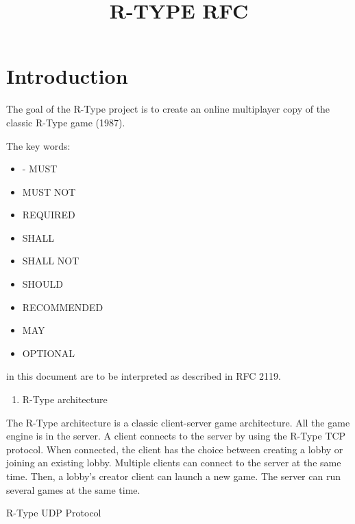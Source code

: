\documentclass[12pt, letterpaper]{article}\title{R-TYPE RFC}
\begin{document}
\section{Introduction}
\vspace{5mm} %

The goal of the R-Type project is to create an online multiplayer copy
of the classic R-Type game (1987).

The key words:  
\begin{itemize}
    \item - MUST
    \item MUST NOT
    \item REQUIRED
    \item SHALL
    \item SHALL NOT
    \item SHOULD
    \item RECOMMENDED
    \item MAY
    \item OPTIONAL
\end{itemize}

in this document are to be interpreted as described in RFC
2119.

\begin{enumerate}
\item
  R-Type architecture
\end{enumerate}

The R-Type architecture is a classic client-server game architecture.
All the game engine is in the server. A client connects to the server by
using the R-Type TCP protocol. When connected, the client has the choice
between creating a lobby or joining an existing lobby. Multiple clients
can connect to the server at the same time. Then, a lobby's creator
client can launch a new game. The server can run several games at the
same time.

R-Type UDP Protocol
\end{document}
